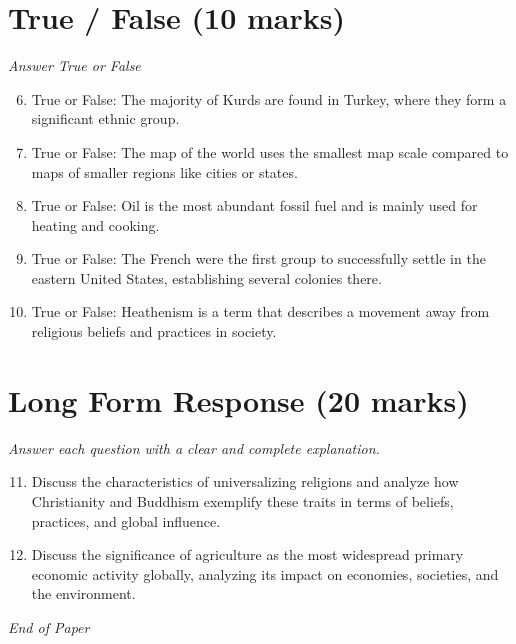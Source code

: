 \documentclass[12pt]{article}
\begin{document}
\section*{True / False (10 marks)}
\textit{Answer True or False}
\begin{enumerate}[label=\arabic*.]
\setcounter{enumi}{5}
\item True or False: The majority of Kurds are found in Turkey, where they form a significant ethnic group.
\item True or False: The map of the world uses the smallest map scale compared to maps of smaller regions like cities or states.
\item True or False: Oil is the most abundant fossil fuel and is mainly used for heating and cooking.
\item True or False: The French were the first group to successfully settle in the eastern United States, establishing several colonies there.
\item True or False: Heathenism is a term that describes a movement away from religious beliefs and practices in society.
\end{enumerate}

\section*{Long Form Response (20 marks)}
\textit{Answer each question with a clear and complete explanation.}
\begin{enumerate}[label=\arabic*.]
\setcounter{enumi}{10}
\item Discuss the characteristics of universalizing religions and analyze how Christianity and Buddhism exemplify these traits in terms of beliefs, practices, and global influence.
\item Discuss the significance of agriculture as the most widespread primary economic activity globally, analyzing its impact on economies, societies, and the environment.
\end{enumerate}

\vfill
\noindent\textit{End of Paper}
\end{document}
